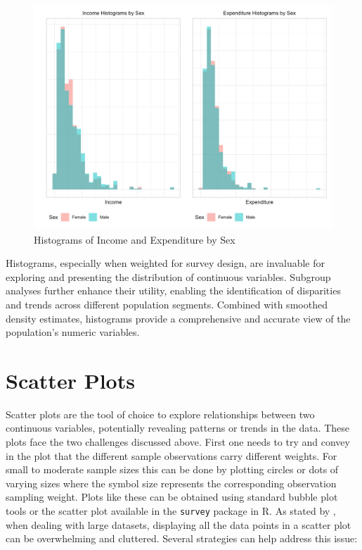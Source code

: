 \documentclass[
  12pt,
]{book}
\begin{document}
\begin{figure}
\includegraphics[width=33.33in]{www/05_graficas/02_Hist_sex} \caption{Histograms of Income and Expenditure by Sex}\label{fig:HistIncomeExpenditureSex}
\end{figure}

Histograms, especially when weighted for survey design, are invaluable for exploring and presenting the distribution of continuous variables. Subgroup analyses further enhance their utility, enabling the identification of disparities and trends across different population segments. Combined with smoothed density estimates, histograms provide a comprehensive and accurate view of the population's numeric variables.

\hypertarget{scatter-plots}{%
\section{Scatter Plots}\label{scatter-plots}}

Scatter plots are the tool of choice to explore relationships between two continuous variables, potentially revealing patterns or trends in the data. These plots face the two challenges discussed above. First one needs to try and convey in the plot that the different sample observations carry different weights. For small to moderate sample sizes this can be done by plotting circles or dots of varying sizes where the symbol size represents the corresponding observation sampling weight. Plots like these can be obtained using standard bubble plot tools or the scatter plot available in the \texttt{survey} package in R. As stated by \citet{Lumley2010}, when dealing with large datasets, displaying all the data points in a scatter plot can be overwhelming and cluttered. Several strategies can help address this issue:
\end{document}
